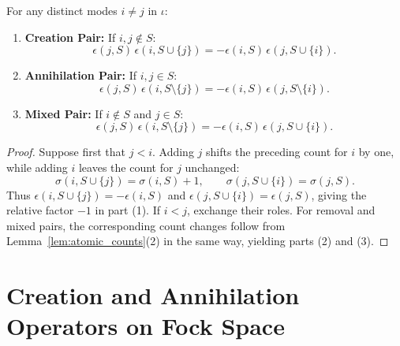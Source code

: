 \begin{theorem}
\label{thm:sign_exchange}
For any distinct modes $i \neq j$ in $\iota$:
\begin{enumerate}
    \item \textbf{Creation Pair:} If $i, j \notin S$:
    \begin{equation}
    \epsilon(j, S)\, \epsilon(i, S \cup \{j\}) = - \epsilon(i, S)\, \epsilon(j, S \cup \{i\}).
    \end{equation}
    \item \textbf{Annihilation Pair:} If $i, j \in S$:
    \begin{equation}
    \epsilon(j, S)\, \epsilon(i, S \setminus \{j\}) = - \epsilon(i, S)\, \epsilon(j, S \setminus \{i\}).
    \end{equation}
    \item \textbf{Mixed Pair:} If $i \notin S$ and $j \in S$:
    \begin{equation}
    \epsilon(j, S)\, \epsilon(i, S \setminus \{j\}) = - \epsilon(i, S)\, \epsilon(j, S \cup \{i\}).
    \end{equation}
\end{enumerate}
\end{theorem}

\begin{proof}
Suppose first that $j<i$. Adding $j$ shifts the preceding count for $i$ by one, while adding $i$ leaves the count for $j$ unchanged:
\begin{equation}
\sigma(i,S\cup\{j\})=\sigma(i,S)+1,\qquad
\sigma(j,S\cup\{i\})=\sigma(j,S).
\end{equation}
Thus $\epsilon(i,S\cup\{j\})=-\epsilon(i,S)$ and $\epsilon(j,S\cup\{i\})=\epsilon(j,S)$, giving the relative factor $-1$ in part (1). If $i<j$, exchange their roles. For removal and mixed pairs, the corresponding count changes follow from Lemma~\ref{lem:atomic_counts}(2) in the same way, yielding parts (2) and (3).
\end{proof}

\section{Creation and Annihilation Operators on Fock Space}

